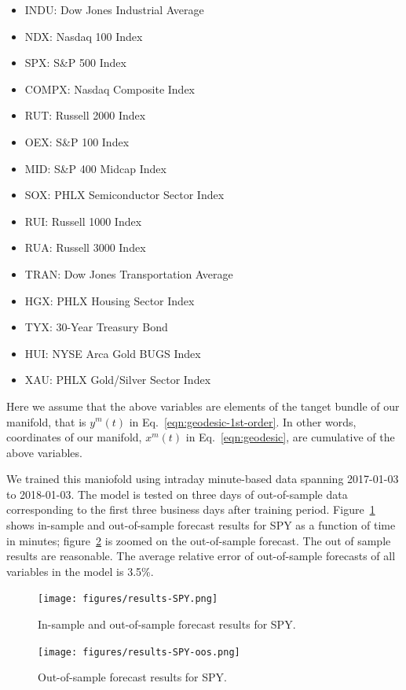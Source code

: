 \documentclass{article}
\begin{document}
\begin{itemize}
    \item[] INDU:  Dow Jones Industrial Average 
    \item[] NDX:   Nasdaq 100 Index 
    \item[] SPX:   S\&P 500 Index 
    \item[] COMPX: Nasdaq Composite Index 
    \item[] RUT:   Russell 2000 Index 
    \item[] OEX:   S\&P 100 Index 
    \item[] MID:   S\&P 400 Midcap Index 
    \item[] SOX:   PHLX Semiconductor Sector Index 
    \item[] RUI:   Russell 1000 Index 
    \item[] RUA:   Russell 3000 Index 
    \item[] TRAN:  Dow Jones Transportation Average 
    \item[] HGX:   PHLX Housing Sector Index 
    \item[] TYX:   30-Year Treasury Bond 
    \item[] HUI:   NYSE Arca Gold BUGS Index 
    \item[] XAU:   PHLX Gold/Silver Sector Index
\end{itemize}

Here we assume that the above variables are elements of the tanget
bundle of our manifold, that is $y^{m}(t)$ in
Eq.~\ref{eqn:geodesic-1st-order}. In other words, coordinates of our
manifold, $x^{m}(t)$ in Eq.~\ref{eqn:geodesic}, are cumulative of the
above variables.

We trained this maniofold using intraday minute-based data spanning
2017-01-03 to 2018-01-03. The model is tested on three days of
out-of-sample data corresponding to the first three business days
after training period. Figure~\ref{fig:results-spy} shows in-sample
and out-of-sample forecast results for SPY as a function of time in
minutes; figure~\ref{fig:results-spy-oos} is zoomed on the
out-of-sample forecast. The out of sample results are reasonable. The
average relative error of out-of-sample forecasts of all variables in
the model is 3.5\%.

\begin{figure}\label{fig:results-spy}
\texttt{[image: figures/results-SPY.png]}
\caption{In-sample and out-of-sample forecast results for SPY.}
\end{figure}

\begin{figure}\label{fig:results-spy-oos}
\texttt{[image: figures/results-SPY-oos.png]}
\caption{Out-of-sample forecast results for SPY.}
\end{figure}
\end{document}
